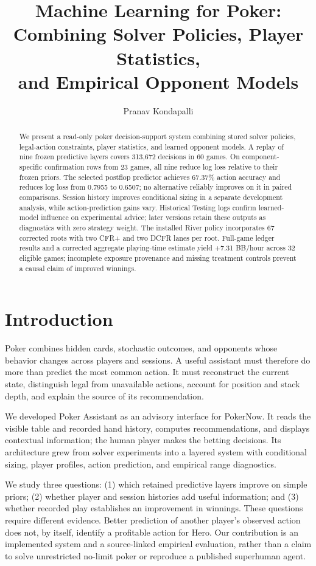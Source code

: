 \documentclass[11pt]{article}
\title{\textbf{Machine Learning for Poker:\\Combining Solver Policies, Player Statistics,\\and Empirical Opponent Models}}
\author{Pranav Kondapalli}
\date{}
\begin{document}
\maketitle
\begin{abstract}
We present a read-only poker decision-support system combining stored solver policies, legal-action constraints, player statistics, and learned opponent models. A replay of nine frozen predictive layers covers 313,672 decisions in 60 games. On component-specific confirmation rows from 23 games, all nine reduce log loss relative to their frozen priors. The selected postflop predictor achieves 67.37\% action accuracy and reduces log loss from 0.7955 to 0.6507; no alternative reliably improves on it in paired comparisons. Session history improves conditional sizing in a separate development analysis, while action-prediction gains vary. Historical Testing logs confirm learned-model influence on experimental advice; later versions retain these outputs as diagnostics with zero strategy weight. The installed River policy incorporates 67 corrected roots with two CFR+ and two DCFR lanes per root. Full-game ledger results and a corrected aggregate playing-time estimate yield +7.31 BB/hour across 32 eligible games; incomplete exposure provenance and missing treatment controls prevent a causal claim of improved winnings. 
\end{abstract}

\section{Introduction}
Poker combines hidden cards, stochastic outcomes, and opponents whose behavior changes across players and sessions. A useful assistant must therefore do more than predict the most common action. It must reconstruct the current state, distinguish legal from unavailable actions, account for position and stack depth, and explain the source of its recommendation.

We developed Poker Assistant as an advisory interface for PokerNow. It reads the visible table and recorded hand history, computes recommendations, and displays contextual information; the human player makes the betting decisions. Its architecture grew from solver experiments into a layered system with conditional sizing, player profiles, action prediction, and empirical range diagnostics.

We study three questions: (1) which retained predictive layers improve on simple priors; (2) whether player and session histories add useful information; and (3) whether recorded play establishes an improvement in winnings. These questions require different evidence. Better prediction of another player's observed action does not, by itself, identify a profitable action for Hero. Our contribution is an implemented system and a source-linked empirical evaluation, rather than a claim to solve unrestricted no-limit poker or reproduce a published superhuman agent.
\end{document}
